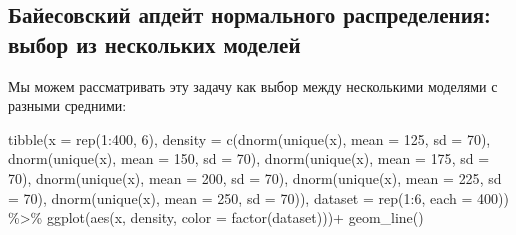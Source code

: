 \documentclass[
]{book}
\newenvironment{Shaded}{\begin{snugshade}}{\end{snugshade}}
\newcommand{\AttributeTok}[1]{\textcolor[rgb]{0.77,0.63,0.00}{#1}}
\newcommand{\DecValTok}[1]{\textcolor[rgb]{0.00,0.00,0.81}{#1}}
\newcommand{\FunctionTok}[1]{\textcolor[rgb]{0.00,0.00,0.00}{#1}}
\newcommand{\NormalTok}[1]{#1}
\newcommand{\SpecialCharTok}[1]{\textcolor[rgb]{0.00,0.00,0.00}{#1}}
\begin{document}
\hypertarget{ux431ux430ux439ux435ux441ux43eux432ux441ux43aux438ux439-ux430ux43fux434ux435ux439ux442-ux43dux43eux440ux43cux430ux43bux44cux43dux43eux433ux43e-ux440ux430ux441ux43fux440ux435ux434ux435ux43bux435ux43dux438ux44f-ux432ux44bux431ux43eux440-ux438ux437-ux43dux435ux441ux43aux43eux43bux44cux43aux438ux445-ux43cux43eux434ux435ux43bux435ux439}{%
\subsection{Байесовский апдейт нормального распределения: выбор из нескольких моделей}\label{ux431ux430ux439ux435ux441ux43eux432ux441ux43aux438ux439-ux430ux43fux434ux435ux439ux442-ux43dux43eux440ux43cux430ux43bux44cux43dux43eux433ux43e-ux440ux430ux441ux43fux440ux435ux434ux435ux43bux435ux43dux438ux44f-ux432ux44bux431ux43eux440-ux438ux437-ux43dux435ux441ux43aux43eux43bux44cux43aux438ux445-ux43cux43eux434ux435ux43bux435ux439}}

Мы можем рассматривать эту задачу как выбор между несколькими моделями с разными средними:

\begin{Shaded}
\begin{Highlighting}[]
\FunctionTok{tibble}\NormalTok{(}\AttributeTok{x =} \FunctionTok{rep}\NormalTok{(}\DecValTok{1}\SpecialCharTok{:}\DecValTok{400}\NormalTok{, }\DecValTok{6}\NormalTok{),}
           \AttributeTok{density =} \FunctionTok{c}\NormalTok{(}\FunctionTok{dnorm}\NormalTok{(}\FunctionTok{unique}\NormalTok{(x), }\AttributeTok{mean =} \DecValTok{125}\NormalTok{, }\AttributeTok{sd =} \DecValTok{70}\NormalTok{),}
                       \FunctionTok{dnorm}\NormalTok{(}\FunctionTok{unique}\NormalTok{(x), }\AttributeTok{mean =} \DecValTok{150}\NormalTok{, }\AttributeTok{sd =} \DecValTok{70}\NormalTok{),}
                       \FunctionTok{dnorm}\NormalTok{(}\FunctionTok{unique}\NormalTok{(x), }\AttributeTok{mean =} \DecValTok{175}\NormalTok{, }\AttributeTok{sd =} \DecValTok{70}\NormalTok{),}
                       \FunctionTok{dnorm}\NormalTok{(}\FunctionTok{unique}\NormalTok{(x), }\AttributeTok{mean =} \DecValTok{200}\NormalTok{, }\AttributeTok{sd =} \DecValTok{70}\NormalTok{),}
                       \FunctionTok{dnorm}\NormalTok{(}\FunctionTok{unique}\NormalTok{(x), }\AttributeTok{mean =} \DecValTok{225}\NormalTok{, }\AttributeTok{sd =} \DecValTok{70}\NormalTok{),}
                       \FunctionTok{dnorm}\NormalTok{(}\FunctionTok{unique}\NormalTok{(x), }\AttributeTok{mean =} \DecValTok{250}\NormalTok{, }\AttributeTok{sd =} \DecValTok{70}\NormalTok{)),}
           \AttributeTok{dataset =} \FunctionTok{rep}\NormalTok{(}\DecValTok{1}\SpecialCharTok{:}\DecValTok{6}\NormalTok{, }\AttributeTok{each =} \DecValTok{400}\NormalTok{)) }\SpecialCharTok{\%\textgreater{}\%} 
  \FunctionTok{ggplot}\NormalTok{(}\FunctionTok{aes}\NormalTok{(x, density, }\AttributeTok{color =} \FunctionTok{factor}\NormalTok{(dataset)))}\SpecialCharTok{+}
  \FunctionTok{geom\_line}\NormalTok{()}
\end{Highlighting}
\end{Shaded}
\end{document}
